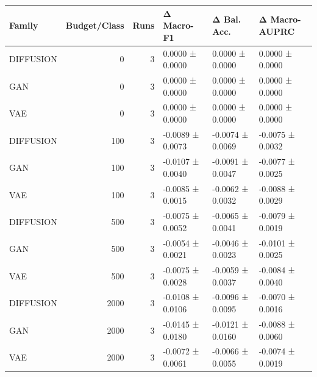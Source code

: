 \begin{tabular}{lrrlll}
\toprule
Family & Budget/Class & Runs & Δ Macro-F1 & Δ Bal. Acc. & Δ Macro-AUPRC \\
\midrule
DIFFUSION & 0 & 3 & 0.0000 ± 0.0000 & 0.0000 ± 0.0000 & 0.0000 ± 0.0000 \\
GAN & 0 & 3 & 0.0000 ± 0.0000 & 0.0000 ± 0.0000 & 0.0000 ± 0.0000 \\
VAE & 0 & 3 & 0.0000 ± 0.0000 & 0.0000 ± 0.0000 & 0.0000 ± 0.0000 \\
DIFFUSION & 100 & 3 & -0.0089 ± 0.0073 & -0.0074 ± 0.0069 & -0.0075 ± 0.0032 \\
GAN & 100 & 3 & -0.0107 ± 0.0040 & -0.0091 ± 0.0047 & -0.0077 ± 0.0025 \\
VAE & 100 & 3 & -0.0085 ± 0.0015 & -0.0062 ± 0.0032 & -0.0088 ± 0.0029 \\
DIFFUSION & 500 & 3 & -0.0075 ± 0.0052 & -0.0065 ± 0.0041 & -0.0079 ± 0.0019 \\
GAN & 500 & 3 & -0.0054 ± 0.0021 & -0.0046 ± 0.0023 & -0.0101 ± 0.0025 \\
VAE & 500 & 3 & -0.0075 ± 0.0028 & -0.0059 ± 0.0037 & -0.0084 ± 0.0040 \\
DIFFUSION & 2000 & 3 & -0.0108 ± 0.0106 & -0.0096 ± 0.0095 & -0.0070 ± 0.0016 \\
GAN & 2000 & 3 & -0.0145 ± 0.0180 & -0.0121 ± 0.0160 & -0.0088 ± 0.0060 \\
VAE & 2000 & 3 & -0.0072 ± 0.0061 & -0.0066 ± 0.0055 & -0.0074 ± 0.0019 \\
\bottomrule
\end{tabular}
